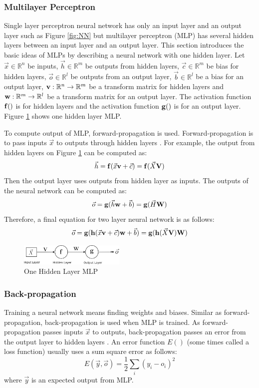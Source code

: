 \documentclass[draft,dvipsnames]{drexel-thesis}
\begin{document}
\begin{thesis}
\subsubsection{Multilayer Perceptron}\label{subsubsec:MLP}
Single layer perceptron neural network has only an input layer and an output layer such as Figure \ref{fig:NN} but multilayer perceptron (MLP) has several hidden layers between an input layer and an output layer. This section introduces the basic ideas of MLPs by describing a neural network with one hidden layer. Let $\vec{x} \in \mathbb{R}^n$ be inputs, $\vec{h} \in \mathbb{R}^m$ be outputs from hidden layers, $\vec{c} \in \mathbb{R}^m$ be bias for hidden layers, $\vec{o} \in \mathbb{R}^l$ be outputs from an output layer, $\vec{b} \in \mathbb{R}^l$ be a bias for an output layer, $\bold{v}: \mathbb{R}^n \rightarrow \mathbb{R}^m$ be a transform matrix for hidden layers and $\bold{w}: \mathbb{R}^m \rightarrow \mathbb{R}^l$ be a transform matrix for an output layer. The activation function $\bold{f}()$ is for hidden layers and the activation function $\bold{g}()$ is for an output layer. Figure \ref{fig:MLP} shows one hidden layer MLP.

To compute output of MLP, forward-propagation is used. Forward-propagation is to pass inputs $\vec{x}$ to outputs through hidden layers \cite{murphy2012machine}. For example, the output from hidden layers on Figure \ref{fig:MLP} can be computed as:
$$\vec{h} = \bold{f}(\vec{x}\bold{v}+\vec{c}) = \bold{f}(\vec{X}\bold{V})$$
Then the output layer uses outputs from hidden layer as inputs. The outputs of the neural network can be computed as:
$$\vec{o} = \bold{g}(\vec{h}\bold{w}+\vec{b}) = \bold{g}(\vec{H}\bold{W})$$
Therefore, a final equation for two layer neural network is as follows:
$$\vec{o} = \bold{g}(\bold{h}(\vec{x}\bold{v}+\vec{c})\bold{w}+\vec{b}) = \bold{g}(\bold{h}(\vec{X}\bold{V})\bold{W})$$

\begin{figure}[t!]
    \centering
    \includegraphics[width=0.45\textwidth]{pictures/figures/MLP.png}
    \caption{One Hidden Layer MLP}
    \label{fig:MLP}
\end{figure}


\subsubsection{Back-propagation}\label{subsubsec:BP}
Training a neural network means finding weights and biases. Similar as forward-propagation, back-propagation is used when MLP is trained. As forward-propagation passes inputs $\vec{x}$ to outputs, back-propagation passes an error from the output layer to hidden layers \cite{murphy2012machine}. An error function $E()$ (some times called a loss function) usually uses a sum square error as follows:
$$E(\vec{y}, \vec{o}) = \frac{1}{2}\sum_{i}(y_i-o_i)^2$$
where $\vec{y}$ is an expected output from MLP.


\end{thesis}
\end{document}

